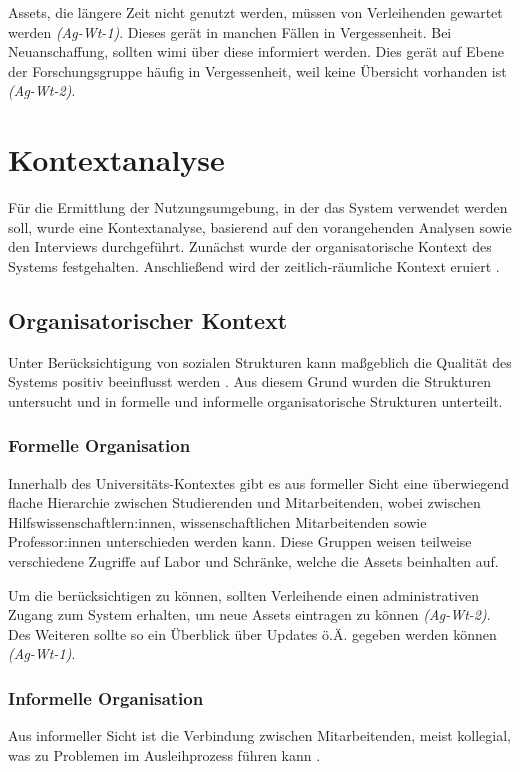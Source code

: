 Assets, die längere Zeit nicht genutzt werden, müssen von Verleihenden gewartet werden \textit{(Ag-Wt-1)}. Dieses gerät
in manchen Fällen in Vergessenheit. Bei Neuanschaffung, sollten \ac{wimi} über diese informiert werden. Dies gerät auf Ebene der
Forschungsgruppe häufig in Vergessenheit, weil keine Übersicht vorhanden ist \textit{(Ag-Wt-2)}.



\section{Kontextanalyse}
\label{section:kontext}

Für die Ermittlung der Nutzungsumgebung, in der das System verwendet werden soll, wurde eine
Kontextanalyse, basierend auf den vorangehenden Analysen sowie den Interviews durchgeführt. Zunächst
wurde der organisatorische Kontext des Systems festgehalten. Anschließend wird der
zeitlich-räumliche Kontext eruiert \cite{herczeg_software-ergonomie_2018}.

\subsection{Organisatorischer Kontext}
Unter Berücksichtigung von sozialen Strukturen kann maßgeblich die Qualität des Systems positiv
beeinflusst werden \cite{herczeg_software-ergonomie_2018}. Aus diesem Grund wurden die Strukturen untersucht
und in formelle und informelle organisatorische Strukturen unterteilt.

\subsubsection{Formelle Organisation}
Innerhalb des Universitäts-Kontextes gibt es aus formeller Sicht eine überwiegend flache Hierarchie
zwischen Studierenden und Mitarbeitenden, wobei zwischen Hilfswissenschaftlern:innen,
wissenschaftlichen Mitarbeitenden sowie Professor:innen unterschieden werden kann. Diese Gruppen
weisen teilweise verschiedene Zugriffe auf Labor und Schränke, welche die Assets
beinhalten auf.

Um die  berücksichtigen zu können, sollten Verleihende einen administrativen
Zugang zum System erhalten, um neue Assets eintragen zu können \textit{(Ag-Wt-2)}. Des Weiteren
sollte so ein Überblick über Updates ö.Ä. gegeben werden können \textit{(Ag-Wt-1)}.

\subsubsection{Informelle Organisation}
Aus informeller Sicht ist die Verbindung zwischen Mitarbeitenden, meist kollegial, was zu Problemen
im Ausleihprozess führen kann .

